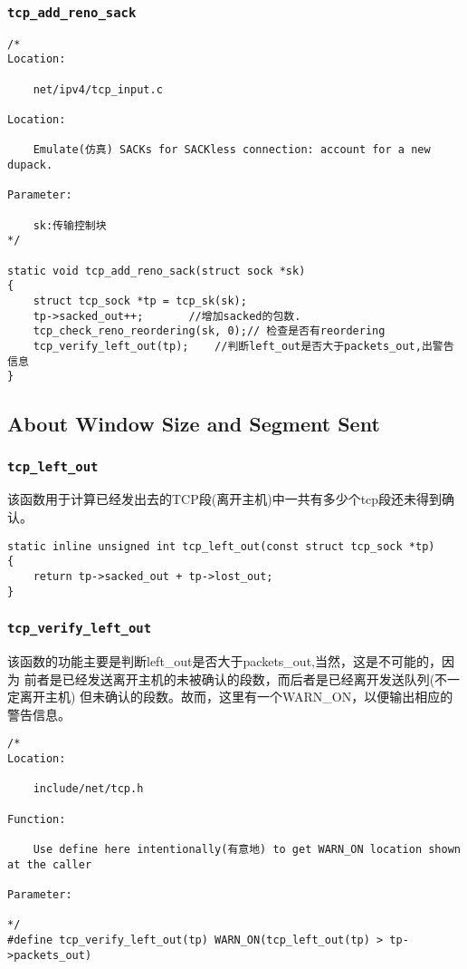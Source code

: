         \subsubsection{\texttt{tcp_add_reno_sack}}
\begin{verbatim}
/* 
Location:

    net/ipv4/tcp_input.c

Location:

    Emulate(仿真) SACKs for SACKless connection: account for a new dupack.

Parameter:

    sk:传输控制块
*/

static void tcp_add_reno_sack(struct sock *sk)
{
    struct tcp_sock *tp = tcp_sk(sk);
    tp->sacked_out++;       //增加sacked的包数.
    tcp_check_reno_reordering(sk, 0);// 检查是否有reordering
    tcp_verify_left_out(tp);    //判断left_out是否大于packets_out,出警告信息
}
\end{verbatim}
    \subsection{About Window Size and Segment Sent}
        
        \subsubsection{\texttt{tcp_left_out}}
            该函数用于计算已经发出去的TCP段(离开主机)中一共有多少个tcp段还未得到确认。
\begin{verbatim}
static inline unsigned int tcp_left_out(const struct tcp_sock *tp)
{
    return tp->sacked_out + tp->lost_out;
}
\end{verbatim}
        \subsubsection{\texttt{tcp_verify_left_out}}
            该函数的功能主要是判断left\_out是否大于packets\_out,当然，这是不可能的，因为
            前者是已经发送离开主机的未被确认的段数，而后者是已经离开发送队列(不一定离开主机)
            但未确认的段数。故而，这里有一个WARN\_ON，以便输出相应的警告信息。
\begin{verbatim}
/* 
Location:

    include/net/tcp.h

Function:

    Use define here intentionally(有意地) to get WARN_ON location shown at the caller 

Parameter:

*/
#define tcp_verify_left_out(tp) WARN_ON(tcp_left_out(tp) > tp->packets_out)     
\end{verbatim}
